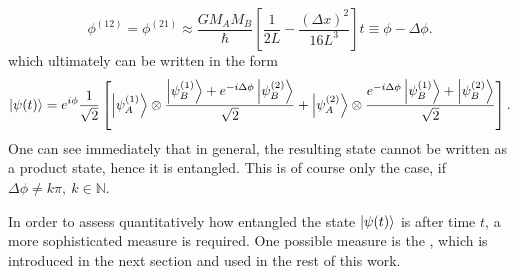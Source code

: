 \begin{equation}\label{eq:2:definition-delta-phi}
  \phi^{(12)} = \phi^{(21)} \approx \frac{GM_AM_B}{\hbar} \left[ \frac{1}{2L} - \frac{(\Delta x)^2}{16 L^3} \right] t \equiv \phi - \Delta\phi .
\end{equation}
which ultimately can be written in the form
\begin{equation}\label{eq:2:evolved-state-factored}
  \ket{\psi(t)} = e^{i\phi}\frac{1}{\sqrt{2}}\left[ 
    \ket{\psi_A^{(1)}} \otimes \frac{\ket{\psi_B^{(1)}} + e^{-i\Delta\phi} \ket{\psi_B^{(2)}}}{\sqrt{2}}
    + \ket{\psi_A^{(2)}} \otimes \frac{e^{-i\Delta\phi} \ket{\psi_B^{(1)}} + \ket{\psi_B^{(2)}}}{\sqrt{2}} \right] .
\end{equation}
One can see immediately that in general, the resulting state cannot be written as a product state, hence it is entangled.
This is of course only the case, if $\Delta \phi \neq k\pi, \ k\in\mathbb{N}$.

In order to assess quantitatively how entangled the state $\ket{\psi(t)}$ is after time $t$, a more sophisticated measure is required. 
One possible measure is the , which is introduced in the next section and used in the rest of this work.